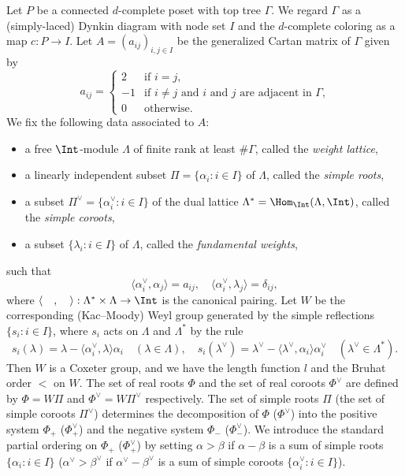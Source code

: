 Let $P$ be a connected $d$-complete poset with top tree $\Gamma$.
We regard $\Gamma$ as a (simply-laced) Dynkin diagram with node set $I$ 
and the $d$-complete coloring as a map $c : P \to I$.
Let $A = (a_{ij})_{i,j \in I}$ be the generalized Cartan matrix of $\Gamma$ given by
$$
a_{ij}
 =
\begin{cases}
 2 &\text{if $i=j$,} \\
 -1 &\text{if $i \neq j$ and $i$ and $j$ are adjacent in $\Gamma$,} \\
 0 &\text{otherwise.}
\end{cases}
$$
We fix the following data associated to $A$:
\begin{itemize}
\item
a free $\Int$-module $\Lambda$ of finite rank at least $\# \Gamma$, called the \emph{weight lattice},
\item
a linearly independent subset $\Pi = \{ \alpha_i : i \in I \}$ of $\Lambda$, called the \emph{simple roots},
\item
a subset $\Pi^\vee = \{ \alpha^\vee_i : i \in I \}$ of the dual lattice $\Lambda^* = \Hom_\Int(\Lambda,\Int)$, 
called the \emph{simple coroots},
\item
a subset $\{ \lambda_i : i \in I \}$ of $\Lambda$, called the \emph{fundamental weights},
\end{itemize}
such that
$$
\langle \alpha^\vee_i, \alpha_j \rangle = a_{ij},
\quad
\langle \alpha^\vee_i, \lambda_j \rangle = \delta_{ij},
$$
where $\langle \quad, \quad \rangle : \Lambda^* \times \Lambda \to \Int$ is the canonical pairing.
Let $W$ be the corresponding 
(Kac--Moody) Weyl group generated by the simple reflections $\{ s_i : i \in I \}$, 
where $s_i$ acts on $\Lambda$ and $\Lambda^*$ by the rule
$$
s_i(\lambda) = \lambda - \langle \alpha_i^\vee, \lambda \rangle \alpha_i
\quad(\lambda \in \Lambda),
\quad
s_i(\lambda^\vee) = \lambda^\vee - \langle \lambda^\vee, \alpha_i \rangle \alpha^\vee_i
\quad(\lambda^\vee \in \Lambda^*).
$$
Then $W$ is a Coxeter group, and we have the length function $l$ and the Bruhat order $<$ on $W$.
The set of real roots $\Phi$ and the set of real coroots $\Phi^\vee$ are defined by 
$\Phi = W \Pi$ and $\Phi^\vee = W \Pi^\vee$ respectively.
The set of simple roots $\Pi$ (\resp the set of simple coroots $\Pi^\vee$) determines 
the decomposition of $\Phi$ (\resp $\Phi^\vee$) into the positive system $\Phi_+$ (\resp $\Phi^\vee_+$) and 
the negative system $\Phi_-$ (\resp $\Phi^\vee_-$).
We introduce the standard partial ordering on $\Phi_+$ (\resp $\Phi^\vee_+$) by setting 
$\alpha > \beta$ if $\alpha - \beta$ is a sum of simple roots $\{ \alpha_i : i \in I \}$ 
(\resp $\alpha^\vee > \beta^\vee$ if $\alpha^\vee - \beta^\vee$ is a sum of simple coroots 
$\{ \alpha^\vee_i : i \in I \}$).

